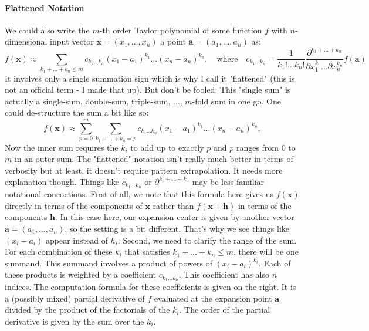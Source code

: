 \paragraph{Flattened Notation}
We could also write the $m$-th order Taylor polynomial of some function $f$ with $n$-dimensional input vector $\mathbf{x} = (x_1, \ldots, x_n)$ a point $\mathbf{a} = (a_1, \ldots, a_n)$ as:
\begin{equation}
\label{Eq:TaylorSeriesMultiDimFlat}
 f(\mathbf{x}) \approx
 \sum_{k_1+\ldots+k_n \leq m} c_{k_1 \ldots k_n} (x_1 - a_1)^{k_1} \ldots (x_n - a_n)^{k_n}, 
 \quad \text{where} \quad
 c_{k_1 \ldots k_n} = \frac{1}{k_1 ! \ldots k_n!} 
                      \frac{ \partial^{k_1+\ldots+k_n} }
                           { \partial x_1 ^{k_1} \ldots \partial x_n ^ {k_n}} f(\mathbf{a})
\end{equation}
It involves only a single summation sign which is why I call it "flattened" (this is not an official term - I made that up). But don't be fooled: This "single sum" is actually a single-sum, double-sum, triple-sum, $\ldots$, $m$-fold sum in one go. One could de-structure the sum a bit like so:
\begin{equation}
 f(\mathbf{x}) \approx
 \sum_{p=0}^{m}
 \sum_{k_1+\ldots+k_n = p} c_{k_1 \ldots k_n} (x_1 - a_1)^{k_1} \ldots (x_n - a_n)^{k_n}, 
\end{equation}
Now the inner sum requires the $k_i$ to add up to exactly $p$ and $p$ ranges from $0$ to $m$ in an outer sum. The "flattened" notation isn't really much better in terms of verbosity but at least, it doesn't require pattern extrapolation. It needs more explanation though. Things like $c_{k_1 \ldots k_n}$ or $\partial^{k_1+\ldots+k_n}$ may be less familiar notational concoctions. First of all, we note that this formula here gives us $f(\mathbf{x})$ directly in terms of the components of $\mathbf{x}$ rather than $f(\mathbf{x + h})$ in terms of the components $\mathbf{h}$. In this case here, our expansion center is given by another vector $\mathbf{a} = (a_1, \ldots, a_n)$, so the setting is a bit different. That's why we see things like $(x_i - a_i)$ appear instead of $h_i$. Second, we need to clarify the range of the sum. For each combination of these $k_i$ that satisfies $k_1+\ldots+k_n \leq m$, there will be one summand. This summand involves a product of powers of $(x_i - a_i)^{k_i}$. Each of these products is weighted by a coefficient $c_{k_1 \ldots k_n}$. This coefficient has also $n$ indices. The computation formula for these coefficients is given on the right. It is a (possibly mixed) partial derivative of $f$ evaluated at the expansion point $\mathbf{a}$ divided by the product of the factorials of the $k_i$. The order of the partial derivative is given by the sum over the $k_i$. 












